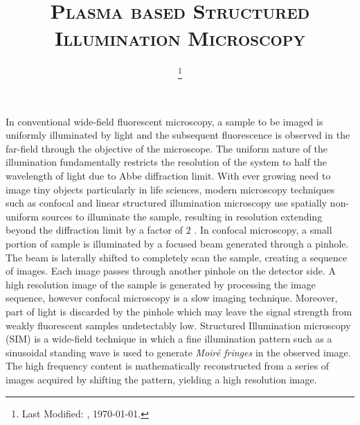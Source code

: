 \documentclass[11pt]{article}
\begin{document}
\title{\textsc{Plasma based Structured Illumination Microscopy}}
\date{\footnote{Last Modified: \currenttime, \today.}}
\maketitle

In conventional wide-field fluorescent microscopy, a sample to be imaged is uniformly illuminated by light and the subsequent fluorescence is observed in the far-field through the objective of the microscope. The uniform nature of the illumination fundamentally restricts the resolution of the system to half the wavelength of light due to Abbe diffraction limit. With ever growing need to image tiny objects particularly in life sciences, modern microscopy techniques such as confocal and linear structured illumination microscopy use spatially non-uniform sources to illuminate the sample, resulting in resolution extending beyond the diffraction limit by a factor of $2$ \cite{Minsky_1988,Gustafsson_2005}. In confocal microscopy, a small portion of sample is illuminated by a focused beam generated through a pinhole. The beam is laterally shifted to completely scan the sample, creating a sequence of images. Each image passes through another pinhole on the detector side. A high resolution image of the sample is generated by processing the image sequence, however confocal microscopy is a slow imaging technique. Moreover, part of light is discarded by the pinhole which may leave the signal strength from weakly fluorescent samples undetectably low. Structured Illumination microscopy (SIM) is a wide-field technique in which a fine illumination pattern such as a sinusoidal standing wave is used to generate \emph{Moiré fringes} in the observed image. The high frequency content is mathematically reconstructed from a series of images acquired by shifting the pattern, yielding a high resolution image.
\end{document}
